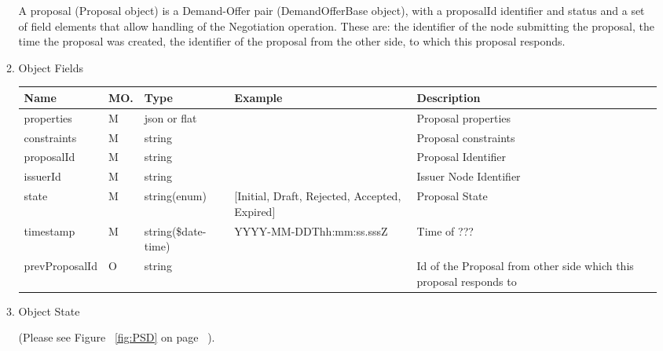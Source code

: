 \begin{enumerate}
\begin{enumerate}
A proposal (Proposal object) is a Demand-Offer pair (DemandOfferBase object), with a proposalId identifier and status
and a set of field elements that allow handling of the Negotiation operation. These are: the identifier of the node submitting the proposal,
the time the proposal was created, the identifier of the proposal from the other side, to which this proposal responds.

\item Object Fields

\begin{table}[H]
\footnotesize

\begin{center}
\begin{tabular}{|p{3cm}|l|p{3cm}|p{3cm}|p{4cm}|} 
\hline
\rowcolor{lightgray}	Name	& MO.	& Type	& Example & 	Description \\
\hline

properties		& M	& 	json or flat		&												&	Proposal properties \\ 
\hline

constraints		& M	& 	string				&												&	Proposal constraints \\ 
\hline

proposalId		& M & 	string  			& 												& 	Proposal Identifier \\
\hline

issuerId		& M & 	string				&												& 	Issuer Node Identifier 	\\ 
\hline

state			& M & 	string(enum) 		& [Initial, Draft, Rejected, Accepted, Expired]	&  Proposal State	\\
\hline

timestamp		& M	& 	string(\$date-time)	& YYYY-MM-DDThh:mm:ss.sssZ						&	Time of ???  \\
\hline

prevProposalId 	& O & 	string				&												& 	Id of the Proposal from other side which this proposal responds to \\
\hline

\end{tabular}
\end{center}
\end{table}

\item Object State

(Please see Figure ~\ref{fig:PSD} on page ~\pageref{fig:PSD}).


\end{enumerate}
\end{enumerate}
